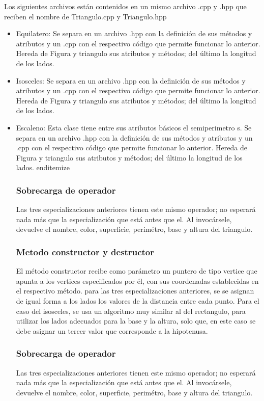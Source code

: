 \documentclass[11pt]{article}
\begin{document}
Los siguientes archivos están contenidos en un mismo archivo .cpp y .hpp que reciben el nombre de Triangulo.cpp y Triangulo.hpp

\begin{itemize}
		\item Equilatero: Se separa en un archivo .hpp con la definición de sus métodos y atributos y un .cpp con el respectivo código que permite funcionar lo anterior.  Hereda de Figura y triangulo sus atributos y métodos; del último la longitud de los lados.

		\item Isosceles: Se separa en un archivo .hpp con la definición de sus métodos y atributos y un .cpp con el respectivo código que permite funcionar lo anterior.  Hereda de Figura y triangulo sus atributos y métodos; del último la longitud de los lados.

		\item Escaleno: Esta clase tiene entre sus atributos básicos el semiperimetro s. Se separa en un archivo .hpp con la definición de sus métodos y atributos y un .cpp con el respectivo código que permite funcionar lo anterior.  Hereda de Figura y triangulo sus atributos y métodos; del último la longitud de los lados.
	end{itemize}

\subsubsection{Sobrecarga de operador ~}
	Las tres especializaciones anteriores tienen este mismo operador; no esperará nada más que la especialización que está antes que el. Al invocársele, devuelve el nombre, color, superficie, perimétro, base y altura del triangulo.

\subsubsection{Metodo constructor y destructor}
	El método constructor recibe como parámetro un puntero de tipo vertice que apunta a los vertices especificados por él, con sus coordenadas establecidas en el respectivo método. para las tres especializaciones anteriores, se se asignan de igual forma a los lados los valores de la distancia entre cada punto. Para el caso del isosceles, se usa un algoritmo muy similar al del rectangulo, para utilizar los lados adecuados para la base y la altura, solo que, en este caso se debe asignar un tercer valor que corresponde a la hipotenusa.

\subsubsection{Sobrecarga de operador ~}
	Las tres especializaciones anteriores tienen este mismo operador; no esperará nada más que la especialización que está antes que el. Al invocársele, devuelve el nombre, color, superficie, perimétro, base y altura del triangulo.


\end{itemize}
\end{document}
